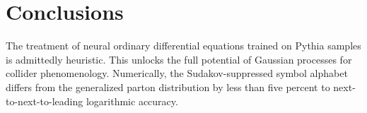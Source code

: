 \section{Conclusions}\label{sec:conclusions}

The treatment of neural ordinary differential equations trained on
Pythia samples is admittedly heuristic. This unlocks the full potential
of Gaussian processes for collider phenomenology. Numerically, the
Sudakov-suppressed symbol alphabet differs from the generalized parton
distribution by less than five percent to next-to-next-to-leading
logarithmic accuracy.

